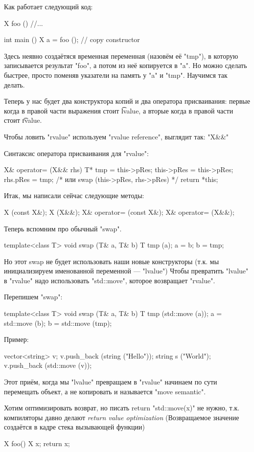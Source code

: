 Как работает следующий код:
\begin{cppcode}
X foo () {
	//...
}

int main () {
	X a = foo (); // copy constructor
}
\end{cppcode}
Здесь неявно создаётяся временная переменная (назовём её \cpp"tmp"), в которую записывается 
результат \cpp"foo", а потом из неё копируется в \cpp"a". Но можно сделать быстрее, просто поменяв 
указатели на память у \cpp"a" и \cpp"tmp". Научимся так делать. 

Теперь у нас будет два конструктора копий и два оператора присваивания: первые когда в правой части выражения стоит \t{lvalue}, 
а вторые когда в правой части стоит \t{rvalue}. 

Чтобы ловить \cpp"rvalue" используем \cpp"rvalue reference", выглядит так: \cpp"X&&"

Синтаксис оператора присваивания для \cpp"rvalue":
\begin{cppcode}
X& operator= (X&& rhs) {
  T* tmp = this->pRes; 
  this->pRes = this->pRes; 
  rhs.pRes = tmp;
  /* или swap (this->pRes, rhs->pRes) */
  return *this; 
}
\end{cppcode}

Итак, мы написали сейчас следующие методы:
\begin{cppcode}
  X (const X&); 
  X (X&&);
  X& operator= (const X&);
  X& operator= (X&&);
\end{cppcode}

Теперь вспомним про обычный \cpp"swap". 
\begin{cppcode}
template<class T>
void swap (T& a, T& b) {
  T tmp (a);
  a = b;
  b = tmp;
}
\end{cppcode}

Но этот swap не будет использовать наши новые конструкторы (т.к. мы инициализируем именованной переменной --- \cpp"lvalue")
Чтобы превратить \cpp"lvalue" в \cpp"rvalue"  надо использовать \cpp"std::move", которое возвращает \cpp"rvalue". 

Перепишем \cpp"swap":
\begin{cppcode}
template<class T>
void swap (T& a, T& b) {
  T tmp (std::move (a));
  a = std::move (b);
  b = std::move (tmp);
}
\end{cppcode}

Пример:
\begin{cppcode}
	vector<string> v;
	v.push_back (string ("Hello"));
	string s ("World");
	v.push_back (std::move (v));
\end{cppcode}

Этот приём, когда мы \cpp"lvalue" превращаем в \cpp"rvalue" начинаем по сути перемещать объект, а не копировать и называется
\cpp"move semantic".

\begin{Rem}
	Хотим оптимизировать возврат, но писать return \cpp"std::move(x)" не нужно, т.к. компиляторы давно делают \textit{return value optimization} (Возвращаемое значение создаётся в кадре стека вызывающей функции) 
	\begin{cppcode}
X foo() {
	X x;
	return x; 
}
	\end{cppcode}
\end{Rem}
